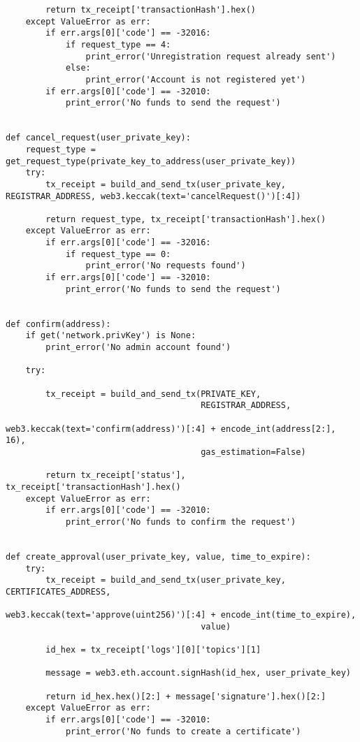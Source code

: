 \begin{verbatim}
        return tx_receipt['transactionHash'].hex()
    except ValueError as err:
        if err.args[0]['code'] == -32016:
            if request_type == 4:
                print_error('Unregistration request already sent')
            else:
                print_error('Account is not registered yet')
        if err.args[0]['code'] == -32010:
            print_error('No funds to send the request')


def cancel_request(user_private_key):
    request_type = get_request_type(private_key_to_address(user_private_key))
    try:
        tx_receipt = build_and_send_tx(user_private_key, REGISTRAR_ADDRESS, web3.keccak(text='cancelRequest()')[:4])

        return request_type, tx_receipt['transactionHash'].hex()
    except ValueError as err:
        if err.args[0]['code'] == -32016:
            if request_type == 0:
                print_error('No requests found')
        if err.args[0]['code'] == -32010:
            print_error('No funds to send the request')


def confirm(address):
    if get('network.privKey') is None:
        print_error('No admin account found')

    try:

        tx_receipt = build_and_send_tx(PRIVATE_KEY,
                                       REGISTRAR_ADDRESS,
                                       web3.keccak(text='confirm(address)')[:4] + encode_int(address[2:], 16),
                                       gas_estimation=False)

        return tx_receipt['status'], tx_receipt['transactionHash'].hex()
    except ValueError as err:
        if err.args[0]['code'] == -32010:
            print_error('No funds to confirm the request')


def create_approval(user_private_key, value, time_to_expire):
    try:
        tx_receipt = build_and_send_tx(user_private_key, CERTIFICATES_ADDRESS,
                                       web3.keccak(text='approve(uint256)')[:4] + encode_int(time_to_expire),
                                       value)

        id_hex = tx_receipt['logs'][0]['topics'][1]

        message = web3.eth.account.signHash(id_hex, user_private_key)

        return id_hex.hex()[2:] + message['signature'].hex()[2:]
    except ValueError as err:
        if err.args[0]['code'] == -32010:
            print_error('No funds to create a certificate')



\end{verbatim}
